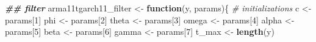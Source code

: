 \documentclass[
]{book}
\newenvironment{Shaded}{\begin{snugshade}}{\end{snugshade}}
\newcommand{\CommentTok}[1]{\textcolor[rgb]{0.56,0.35,0.01}{\textit{#1}}}
\newcommand{\ControlFlowTok}[1]{\textcolor[rgb]{0.13,0.29,0.53}{\textbf{#1}}}
\newcommand{\DecValTok}[1]{\textcolor[rgb]{0.00,0.00,0.81}{#1}}
\newcommand{\DocumentationTok}[1]{\textcolor[rgb]{0.56,0.35,0.01}{\textbf{\textit{#1}}}}
\newcommand{\FunctionTok}[1]{\textcolor[rgb]{0.13,0.29,0.53}{\textbf{#1}}}
\newcommand{\NormalTok}[1]{#1}
\newcommand{\OtherTok}[1]{\textcolor[rgb]{0.56,0.35,0.01}{#1}}
\begin{document}
\begin{Shaded}
\begin{Highlighting}[]
\DocumentationTok{\#\# filter }
\NormalTok{arma11tgarch11\_filter }\OtherTok{\textless{}{-}} \ControlFlowTok{function}\NormalTok{(y, params)\{}
  \CommentTok{\# initializations}
\NormalTok{  c      }\OtherTok{\textless{}{-}}\NormalTok{ params[}\DecValTok{1}\NormalTok{]}
\NormalTok{  phi    }\OtherTok{\textless{}{-}}\NormalTok{ params[}\DecValTok{2}\NormalTok{]}
\NormalTok{  theta  }\OtherTok{\textless{}{-}}\NormalTok{ params[}\DecValTok{3}\NormalTok{]}
\NormalTok{  omega  }\OtherTok{\textless{}{-}}\NormalTok{ params[}\DecValTok{4}\NormalTok{]}
\NormalTok{  alpha  }\OtherTok{\textless{}{-}}\NormalTok{ params[}\DecValTok{5}\NormalTok{]}
\NormalTok{  beta   }\OtherTok{\textless{}{-}}\NormalTok{ params[}\DecValTok{6}\NormalTok{]}
\NormalTok{  gamma  }\OtherTok{\textless{}{-}}\NormalTok{ params[}\DecValTok{7}\NormalTok{]}
\NormalTok{  t\_max  }\OtherTok{\textless{}{-}} \FunctionTok{length}\NormalTok{(y)}
  

\end{Highlighting}
\end{Shaded}
\end{document}
